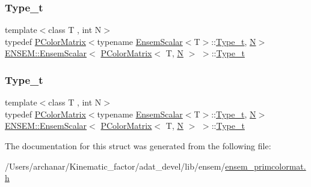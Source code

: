 \subsubsection{\texorpdfstring{Type\_t}{Type\_t}\hspace{0.1cm}{\footnotesize\ttfamily [1/2]}}
{\footnotesize\ttfamily template$<$class T , int N$>$ \\
typedef \mbox{\hyperlink{classENSEM_1_1PColorMatrix}{P\+Color\+Matrix}}$<$typename \mbox{\hyperlink{structENSEM_1_1EnsemScalar}{Ensem\+Scalar}}$<$T$>$\+::\mbox{\hyperlink{structENSEM_1_1EnsemScalar_3_01PColorMatrix_3_01T_00_01N_01_4_01_4_a627b90bc6a46b2ef5b68cc55ae3f914d}{Type\+\_\+t}}, \mbox{\hyperlink{operator__name__util_8cc_a7722c8ecbb62d99aee7ce68b1752f337}{N}}$>$ \mbox{\hyperlink{structENSEM_1_1EnsemScalar}{E\+N\+S\+E\+M\+::\+Ensem\+Scalar}}$<$ \mbox{\hyperlink{classENSEM_1_1PColorMatrix}{P\+Color\+Matrix}}$<$ T, \mbox{\hyperlink{operator__name__util_8cc_a7722c8ecbb62d99aee7ce68b1752f337}{N}} $>$ $>$\+::\mbox{\hyperlink{structENSEM_1_1EnsemScalar_3_01PColorMatrix_3_01T_00_01N_01_4_01_4_a627b90bc6a46b2ef5b68cc55ae3f914d}{Type\+\_\+t}}}

\mbox{\label{structENSEM_1_1EnsemScalar_3_01PColorMatrix_3_01T_00_01N_01_4_01_4_a627b90bc6a46b2ef5b68cc55ae3f914d}} 
\subsubsection{\texorpdfstring{Type\_t}{Type\_t}\hspace{0.1cm}{\footnotesize\ttfamily [2/2]}}
{\footnotesize\ttfamily template$<$class T , int N$>$ \\
typedef \mbox{\hyperlink{classENSEM_1_1PColorMatrix}{P\+Color\+Matrix}}$<$typename \mbox{\hyperlink{structENSEM_1_1EnsemScalar}{Ensem\+Scalar}}$<$T$>$\+::\mbox{\hyperlink{structENSEM_1_1EnsemScalar_3_01PColorMatrix_3_01T_00_01N_01_4_01_4_a627b90bc6a46b2ef5b68cc55ae3f914d}{Type\+\_\+t}}, \mbox{\hyperlink{operator__name__util_8cc_a7722c8ecbb62d99aee7ce68b1752f337}{N}}$>$ \mbox{\hyperlink{structENSEM_1_1EnsemScalar}{E\+N\+S\+E\+M\+::\+Ensem\+Scalar}}$<$ \mbox{\hyperlink{classENSEM_1_1PColorMatrix}{P\+Color\+Matrix}}$<$ T, \mbox{\hyperlink{operator__name__util_8cc_a7722c8ecbb62d99aee7ce68b1752f337}{N}} $>$ $>$\+::\mbox{\hyperlink{structENSEM_1_1EnsemScalar_3_01PColorMatrix_3_01T_00_01N_01_4_01_4_a627b90bc6a46b2ef5b68cc55ae3f914d}{Type\+\_\+t}}}



The documentation for this struct was generated from the following file\+:\begin{DoxyCompactItemize}
\item 
/\+Users/archanar/\+Kinematic\+\_\+factor/adat\+\_\+devel/lib/ensem/\mbox{\hyperlink{lib_2ensem_2ensem__primcolormat_8h}{ensem\+\_\+primcolormat.\+h}}\end{DoxyCompactItemize}
